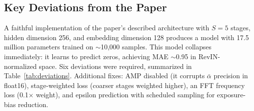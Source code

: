 \documentclass[conference]{IEEEtran}
\begin{document}
\begin{table}[t]
\caption{Best per-benchmark CI+Decomp Transformer configurations (Experiment 18 sweep).}
\label{tab:hparams}
\centering
\small
{}
\end{table}

\subsection{Key Deviations from the Paper}
\label{sec:deviations}
A faithful implementation of the paper's described architecture with $S{=}5$ stages, hidden dimension 256, and embedding dimension 128 produces a model with 17.5 million parameters trained on $\sim$10{,}000 samples. This model collapses immediately: it learns to predict zeros, achieving MAE $\sim$0.95 in RevIN-normalized space. Six deviations were required, summarized in Table~\ref{tab:deviations}. Additional fixes: AMP disabled (it corrupts $\bar{\alpha}$ precision in float16), stage-weighted loss (coarser stages weighted higher), an FFT frequency loss (0.1$\times$ weight), and epsilon prediction with scheduled sampling for exposure-bias reduction.
\end{document}

